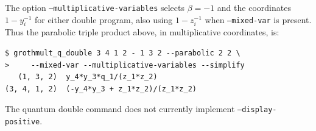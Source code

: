 \documentclass{amsart}
\theoremstyle{definition}
\theoremstyle{remark}
\numberwithin{equation}{section}
\begin{document}
The option \texttt{--multiplicative-variables} selects $\beta=-1$
and the coordinates $1-y_i^{-1}$ for either double program, also using
$1-z_i^{-1}$ when \texttt{--mixed-var} is present.
Thus the parabolic triple product above, in multiplicative
coordinates, is:
\begin{verbatim}
$ grothmult_q_double 3 4 1 2 - 1 3 2 --parabolic 2 2 \
>     --mixed-var --multiplicative-variables --simplify
   (1, 3, 2)  y_4*y_3*q_1/(z_1*z_2)
(3, 4, 1, 2)  (-y_4*y_3 + z_1*z_2)/(z_1*z_2)
\end{verbatim}
The quantum double command does not currently implement
\texttt{--display-positive}.



\end{document}
